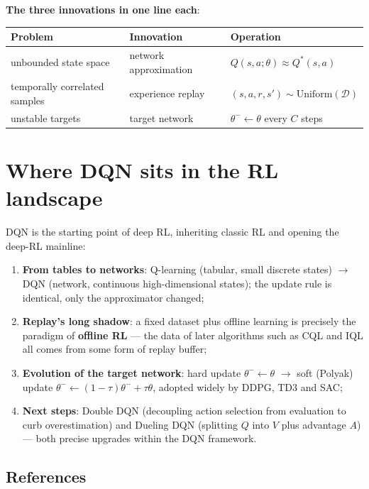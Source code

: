 \documentclass{article}
\begin{document}
\textbf{The three innovations in one line each}:

\begin{center}
\small
\begin{tabular}{l|l|l}
\textbf{Problem} & \textbf{Innovation} & \textbf{Operation} \\
\hline
unbounded state space & network approximation & $Q(s,a;\theta) \approx Q^*(s,a)$ \\[4pt]
temporally correlated samples & experience replay & $(s,a,r,s') \sim \mathrm{Uniform}(\mathcal{D})$ \\[4pt]
unstable targets & target network & $\theta^- \leftarrow \theta$ every $C$ steps\\
\end{tabular}
\end{center}

\section*{Where DQN sits in the RL landscape}

DQN is the starting point of deep RL, inheriting classic RL and opening the deep-RL mainline:

\begin{enumerate}
  \item \textbf{From tables to networks}: Q-learning (tabular, small discrete states) $\to$ DQN (network, continuous high-dimensional states); the update rule is identical, only the approximator changed;
  \item \textbf{Replay's long shadow}: a fixed dataset plus offline learning is precisely the paradigm of \textbf{offline RL} --- the data of later algorithms such as CQL and IQL all comes from some form of replay buffer;
  \item \textbf{Evolution of the target network}: hard update $\theta^- \leftarrow \theta$ $\to$ soft (Polyak) update $\theta^- \leftarrow (1-\tau)\theta^- + \tau\theta$, adopted widely by DDPG, TD3 and SAC;
  \item \textbf{Next steps}: Double DQN (decoupling action selection from evaluation to curb overestimation) and Dueling DQN (splitting $Q$ into $V$ plus advantage $A$) --- both precise upgrades within the DQN framework.
\end{enumerate}

\subsection*{References}
\end{document}

